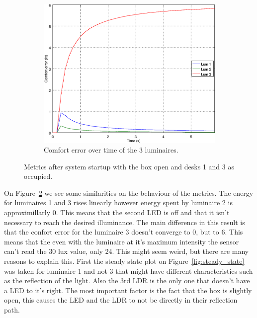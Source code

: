 \begin{figure}[ht]
\begin{subfigure}[t]{0.32\textwidth}
    \centering
    \includegraphics[width=.95\textwidth]{img/n_open_o101}
    \caption{Comfort error over time of the 3 luminaires.}
    \label{fig:n_open_o101}
    \end{subfigure}
    \caption{Metrics after system startup with the box open and desks 1 and 3 as occupied.}
    \label{fig:open_o101}
\end{figure}


On Figure~\ref{fig:open_o101} we see some similarities on the behaviour of the metrics. The energy for luminaires 1 and 3 rises linearly however energy spent by luminaire 2 is approximillarly 0. This means that the second LED is off and that it isn't necessary to reach the desired illuminance. The main difference in this result is that the confort error for the luminaire 3 doesn't converge to 0, but to 6. This means that the even with the luminaire at it's maximum intensity the sensor can't read the 30 lux value, only 24. This might seem weird, but there are many reasons to explain this. First the steady state plot on Figure~\ref{fig:steady_state} was taken for luminaire 1 and not 3 that might have different characteristics such as the reflection of the light. Also the 3rd LDR is the only one that doesn't have a LED to it's right. The most important factor is the fact that the box is slightly open, this causes the LED and the LDR to not be directly in their reflection path.

